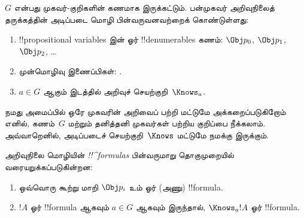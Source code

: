\documentclass[../../../include/open-logic-section]{subfiles}
\begin{document}


\begin{defn}
$G$ என்பது முகவர்-குறிகளின் கணமாக இருக்கட்டும். பன்முகவர் அறிவுநிலைத்
தருக்கத்தின் அடிப்படை மொழி பின்வருவனவற்றைக் கொண்டுள்ளது:
\begin{enumerate}
  \item !!{propositional variable}s இன் ஓர் !!{denumerable}s கணம்: $\Obj
    p_0$, $\Obj p_1$, $\Obj p_2$, \dots
  \item முன்மொழிவு இணைப்பிகள்: \startycommalist
  .
  \item $a \in G$ ஆகும் இடத்தில் அறிவுச் செயற்குறி~$\Knows_a$.
\end{enumerate}
\end{defn}

நமது அமைப்பில் ஒரே முகவரின் அறிவைப் பற்றி மட்டுமே அக்கறைப்படுகிறோம் எனில்,
கணம்~$G$ மற்றும் தனித்தனி முகவர்கள் பற்றிய குறிப்பை நீக்கலாம். அவ்வாறெனில்,
அடிப்படைச் செயற்குறி~$\Knows$ மட்டுமே நமக்கு இருக்கும்.

\begin{defn}
அறிவுநிலை மொழியின் \emph{!!^{formula}s} பின்வருமாறு தொகுமுறையில்
  வரையறுக்கப்படுகின்றன:
\begin{enumerate}


\item ஒவ்வொரு கூற்று மாறி $\Obj p_i$ உம் ஓர் (அணு) !!{formula}.






\item $!A$ ஓர் !!{formula} ஆகவும் $a \in G$ ஆகவும் இருந்தால்,
  $\Knows_a !A$ ஓர் !!{formula}.

\end{enumerate}
\end{defn}
\end{document}
